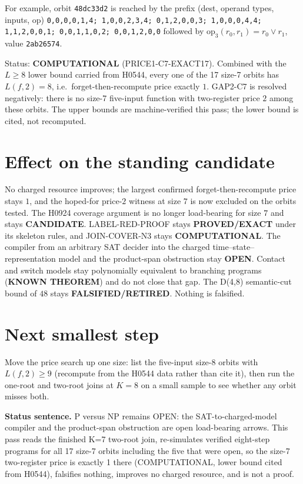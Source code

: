 \documentclass[11pt]{article}
\begin{document}
For example, orbit \texttt{48dc33d2} is reached by the prefix (dest, operand types, inputs, op) \texttt{0,0,0,0,1,4; 1,0,0,2,3,4; 0,1,2,0,0,3; 1,0,0,0,4,4; 1,1,2,0,0,1; 0,0,1,1,0,2; 0,0,1,2,0,0} followed by $\mathrm{op}_3(r_0,r_1)=r_0\lor r_1$, value \texttt{2ab26574}.

Status: \textbf{COMPUTATIONAL} (PRICE1-C7-EXACT17). Combined with the $L\ge8$ lower bound carried from H0544, every one of the 17 size-7 orbits has $L(f,2)=8$, i.e.\ forget-then-recompute price exactly $1$. GAP2-C7 is resolved negatively: there is no size-7 five-input function with two-register price $2$ among these orbits. The upper bounds are machine-verified this pass; the lower bound is cited, not recomputed.

\section*{Effect on the standing candidate}
No charged resource improves; the largest confirmed forget-then-recompute price stays $1$, and the hoped-for price-$2$ witness at size $7$ is now excluded on the orbits tested. The H0924 coverage argument is no longer load-bearing for size $7$ and stays \textbf{CANDIDATE}. LABEL-RED-PROOF stays \textbf{PROVED/EXACT} under its skeleton rules, and JOIN-COVER-N3 stays \textbf{COMPUTATIONAL}. The compiler from an arbitrary SAT decider into the charged time--state--representation model and the product-span obstruction stay \textbf{OPEN}. Contact and switch models stay polynomially equivalent to branching programs (\textbf{KNOWN THEOREM}) and do not close that gap. The D(4,8) semantic-cut bound of $48$ stays \textbf{FALSIFIED/RETIRED}. Nothing is falsified.

\section*{Next smallest step}
Move the price search up one size: list the five-input size-8 orbits with $L(f,2)\ge9$ (recompute from the H0544 data rather than cite it), then run the one-root and two-root joins at $K=8$ on a small sample to see whether any orbit misses both.

\bigskip
\noindent\textbf{Status sentence.} P versus NP remains OPEN: the SAT-to-charged-model compiler and the product-span obstruction are open load-bearing arrows. This pass reads the finished K=7 two-root join, re-simulates verified eight-step programs for all 17 size-7 orbits including the five that were open, so the size-7 two-register price is exactly 1 there (COMPUTATIONAL, lower bound cited from H0544), falsifies nothing, improves no charged resource, and is not a proof.
\end{document}
